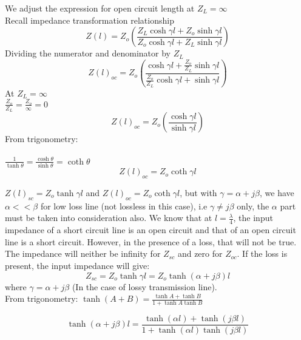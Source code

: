 	We adjust the expression for open circuit length at $ Z_{L} =\infty $ \\
	Recall impedance transformation relationship
	\begin{equation}
	Z(l) = Z_{o}\left(\frac{Z_{L}\cosh\gamma l + Z_{o}\sinh\gamma l}{Z_{o}\cosh\gamma l + Z_{L}\sinh\gamma l}\right)
	\end{equation}
	Dividing the numerator and denominator by $ Z_{L} $
	\begin{equation}
	Z(l)_{oc} = Z_{o}\left(\frac{\cosh\gamma l +\frac{Z_{o}}{Z_{L}}\sinh\gamma l}{\frac{Z_{o}}{Z_{L}}\cosh\gamma l+ \sinh\gamma l}\right)
	\end{equation}
	At $ Z_{L}=\infty $ \\
	$ \frac{Z_{o}}{Z_{L}} =\frac{Z_{o}}{\infty} = 0 $ 
	\begin{equation}
	Z(l)_{oc} = Z_{o}\left(\frac{\cosh\gamma l}{\sinh\gamma l}\right)
	\end{equation} 
	From trigonometry:\\\\ $ \frac{1}{\tanh\theta}=\frac{\cosh\theta}{\sinh\theta}=\coth\theta $\\
		\begin{equation}
	\boxed{Z(l)_{oc}=Z_{o}\coth\gamma l}	\end{equation}
	
	$ Z(l)_{sc}=Z_{o}\tanh\gamma l $ and $ Z(l)_{oc}=Z_{o}\coth\gamma l $, but with $ \gamma=\alpha +j\beta $, we have $ \alpha<<\beta $ for low loss line (not lossless in this case), i.e $ \gamma\neq j\beta $ only, the $ \alpha $ part must be taken into consideration also. We know that at $ l=\frac{\lambda}{4} $, the input impedance of a short circuit line is an open circuit and that of an open circuit line is a short circuit. However, in the presence of a loss, that will not be true. The impedance will neither be infinity for $ Z_{sc} $ and zero for $ Z_{oc} $. If the loss is present, the input impedance will give:\\
		\begin{equation}
	Z_{sc}=Z_{o}\tanh\gamma l=Z_{o}\tanh(\alpha+j\beta)l
	\end{equation}
	 where $ \gamma=\alpha+j\beta $ (In the case of lossy transmission line).\\
	
		From trigonometry:
	$ \tanh(A+B)=\frac{\tanh A+\tanh B}{1+\tanh A\tanh B} $
	
	\begin{equation}
	\tanh(\alpha+j\beta)l=\frac{\tanh (\alpha l) + \tanh (j\beta l)}{1 + \tanh (\alpha l)\tanh (j\beta l)}
	\end{equation}

